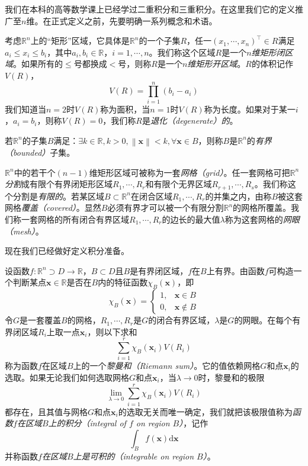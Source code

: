 \documentclass[../main.tex]{subfiles}
\begin{document}
我们在本科的高等数学课上已经学过二重积分和三重积分\cite[\S 8]{华工高数2009下}。在这里我们它的定义推广至$n$维。在正式定义之前，先要明确一系列概念和术语。

考虑$\mathbb{R}^n$上的“矩形”区域，它具体是$\mathbb{R}^n$的一个子集$R$，任一$\left(x_1,\cdots,x_n\right)^\intercal\in R$满足$a_i\leq x_i\leq b_i$，其中$a_i,b_i\in\mathbb{R}$，$i=1,\cdots,n$。我们称这个区域$R$是一个\emph{$n$维矩形闭区域}。如果所有的$\leq$号都换成$<$号，则称$R$是一个\emph{$n$维矩形开区域}。$R$的体积记作$V\left(R\right)$，
\[V\left(R\right)=\prod_{i=1}^n\left(b_i-a_i\right)\]
我们知道当$n=2$时$V\left(R\right)$称为面积，当$n=1$时$V\left(R\right)$称为长度。如果对于某一$i$，$a_i=b_i$，则称$V\left(R\right)=0$，我们称$R$是\emph{退化（degenerate）的}。

若$\mathbb{R}^n$的子集$B$满足：$\exists k\in\mathbb{R},k>0,\left\|\mathbf{x}\right\|<k,\forall\mathbf{x}\in B$，则称$B$是$\mathbb{R}^n$的\emph{有界（bounded）}子集。

$\mathbb{R}^n$中的若干个$\left(n-1\right)$维矩形区域可被称为一套\emph{网格（grid）}。任一套网格可把$\mathbb{R}^n$\emph{分割}成有限个有界闭矩形区域$R_1,\cdots,R_r$和有限个无界区域$R_{r+1},\cdots,R_s$。我们称这个分割是\emph{有限的}。若某区域$B\subset\mathbb{R}^n$在闭合区域$R_1,\cdots,R_r$的并集之内，由称$B$被这套网格\emph{覆盖（covered）}。显然$B$必须有界才可以被一个有限分割$\mathbb{R}^n$的网格所覆盖。我们称一套网格的所有闭合有界区域$R_1,\cdots,R_r$的边长的最大值$\lambda$称为这套网格的\emph{网眼（mesh）}。

现在我们已经做好定义积分准备。

\begin{definition}[$n$重积分的黎曼定义]\label{def:II.4.20}
    设函数$f:\mathbb{R}^n\supset D\rightarrow\mathbb{R}$，$B\subset D$且$B$是有界闭区域，$f$在$B$上有界。由函数$f$可构造一个判断某点$\mathbf{x}\in\mathbb{R}$是否在$B$内的特征函数$\chi_B\left(\mathbf{x}\right)$，即
    \[
        \chi_B\left(\mathbf{x}\right)=\left\{\begin{array}{ll}1,&\mathbf{x}\in B\\0,&\mathbf{x}\notin B\end{array}\right.
    \]
    令$G$是一套覆盖$B$的网格，$R_1,\cdots,R_r$是$G$的闭合有界区域，$\lambda$是$G$的网眼。在每个有界闭区域$R_i$上取一点$\mathbf{x}_i$，则以下求和
    \[\sum_{i=1}^r \chi_B\left(\mathbf{x}_i\right)V\left(R_i\right)
    \]
    称为函数$f$在区域$B$上的一个\emph{黎曼和（Riemann sum）}。它的值依赖网格$G$和点$\mathbf{x}_i$的选取。如果无论我们如何选取网格$G$和点$\mathbf{x}_i$，当$\lambda\rightarrow 0$时，黎曼和的极限
    \[\lim_{\lambda\to 0}\sum_{i=1}^r \chi_B\left(\mathbf{x}_i\right)V\left(R_i\right)\]
    都存在，且其值与网格$G$和点$\mathbf{x}_i$的选取无关而唯一确定，我们就把该极限值称为\emph{函数$f$在区域$B$上的积分（integral of $f$ on region $B$）}，记作
    \[\int_B f\left(\mathbf{x}\right)\mathrm{d}\mathbf{x}\]
    并称函数$f$\emph{在区域$B$上是可积的（integrable on region $B$）}。
\end{definition}
\end{document}
